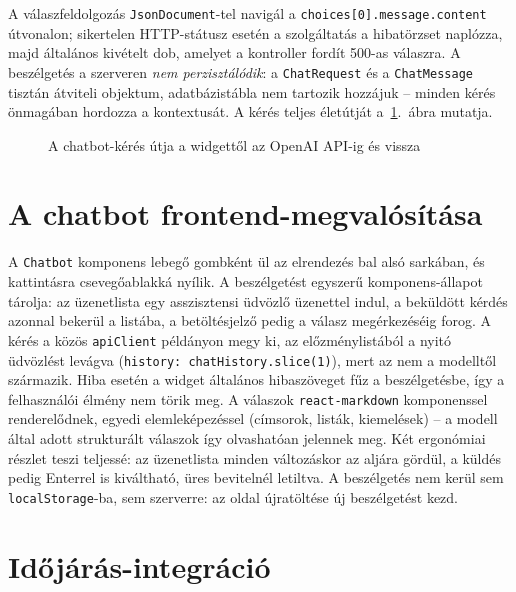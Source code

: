 A válaszfeldolgozás \texttt{JsonDocument}-tel navigál a
\texttt{choices[0].message.content} útvonalon; sikertelen HTTP-státusz esetén a szolgáltatás a
hibatörzset naplózza, majd általános kivételt dob, amelyet a kontroller fordít 500-as válaszra. A
beszélgetés a szerveren \emph{nem perzisztálódik}: a \texttt{ChatRequest} és a
\texttt{ChatMessage} tisztán átviteli objektum, adatbázistábla nem tartozik hozzájuk -- minden
kérés önmagában hordozza a kontextusát. A kérés teljes életútját
a~\ref{fig:chat-sequence}.~ábra mutatja.

\begin{figure}[htbp]
	\centering
	\caption{A chatbot-kérés útja a widgettől az OpenAI API-ig és vissza}
	\label{fig:chat-sequence}
\end{figure}

\section{A chatbot frontend-megvalósítása}
\label{sec:chat-frontend}

A \texttt{Chatbot} komponens lebegő gombként ül az elrendezés bal alsó sarkában, és kattintásra
csevegőablakká nyílik. A beszélgetést egyszerű komponens-állapot tárolja: az üzenetlista egy
asszisztensi üdvözlő üzenettel indul, a beküldött kérdés azonnal bekerül a listába, a
betöltésjelző pedig a válasz megérkezéséig forog. A kérés a közös \texttt{apiClient} példányon
megy ki, az előzménylistából a nyitó üdvözlést levágva (\texttt{history: chatHistory.slice(1)}),
mert az nem a modelltől származik. Hiba esetén a widget általános hibaszöveget fűz a
beszélgetésbe, így a felhasználói élmény nem törik meg. A válaszok \texttt{react-markdown}
komponenssel renderelődnek, egyedi elemleképezéssel (címsorok, listák, kiemelések) -- a modell
által adott strukturált válaszok így olvashatóan jelennek meg. Két ergonómiai részlet teszi
teljessé: az üzenetlista minden változáskor az aljára gördül, a küldés pedig Enterrel is
kiváltható, üres bevitelnél letiltva. A beszélgetés nem kerül sem \texttt{localStorage}-ba, sem
szerverre: az oldal újratöltése új beszélgetést kezd.

\section{Időjárás-integráció}
\label{sec:weather}

